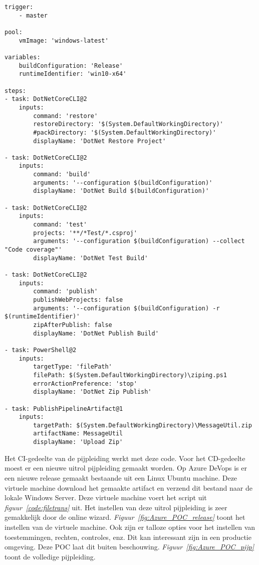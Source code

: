 \begin{lstlisting}
trigger:
    - master

pool:
    vmImage: 'windows-latest'

variables:
    buildConfiguration: 'Release'
    runtimeIdentifier: 'win10-x64'

steps:
- task: DotNetCoreCLI@2
    inputs:
        command: 'restore'
        restoreDirectory: '$(System.DefaultWorkingDirectory)'
        #packDirectory: '$(System.DefaultWorkingDirectory)'
        displayName: 'DotNet Restore Project'

- task: DotNetCoreCLI@2
    inputs:
        command: 'build'
        arguments: '--configuration $(buildConfiguration)'
        displayName: 'DotNet Build $(buildConfiguration)'

- task: DotNetCoreCLI@2
    inputs:
        command: 'test'
        projects: '**/*Test/*.csproj'
        arguments: '--configuration $(buildConfiguration) --collect "Code coverage"'
        displayName: 'DotNet Test Build'
    
- task: DotNetCoreCLI@2
    inputs:
        command: 'publish'
        publishWebProjects: false
        arguments: '--configuration $(buildConfiguration) -r $(runtimeIdentifier)'
        zipAfterPublish: false
        displayName: 'DotNet Publish Build'

- task: PowerShell@2
    inputs:
        targetType: 'filePath'
        filePath: $(System.DefaultWorkingDirectory)\ziping.ps1
        errorActionPreference: 'stop'
        displayName: 'DotNet Zip Publish'

- task: PublishPipelineArtifact@1
    inputs:
        targetPath: $(System.DefaultWorkingDirectory)\MessageUtil.zip
        artifactName: MessageUtil
        displayName: 'Upload Zip'
\end{lstlisting}

Het CI-gedeelte van de pijpleiding werkt met deze code. Voor het CD-gedeelte moest er een nieuwe uitrol pijpleiding gemaakt worden. Op Azure DeVops is er een nieuwe release gemaakt bestaande uit een Linux Ubuntu machine. Deze virtuele machine download het gemaakte artifact en verzend dit bestand naar de lokale Windows Server. Deze virtuele machine voert het script uit \emph{figuur~\ref{code:filetrans}} uit. Het instellen van deze uitrol pijpleiding is zeer gemakkelijk door de online wizard. \emph{Figuur~\ref{fig:Azure_POC_release}} toont het instellen van de virtuele machine. Ook zijn er talloze opties voor het instellen van toestemmingen, rechten, controles, enz. Dit kan interessant zijn in een productie omgeving. Deze POC laat dit buiten beschouwing. \emph{Figuur~\ref{fig:Azure_POC_pijp}} toont de volledige pijpleiding.

